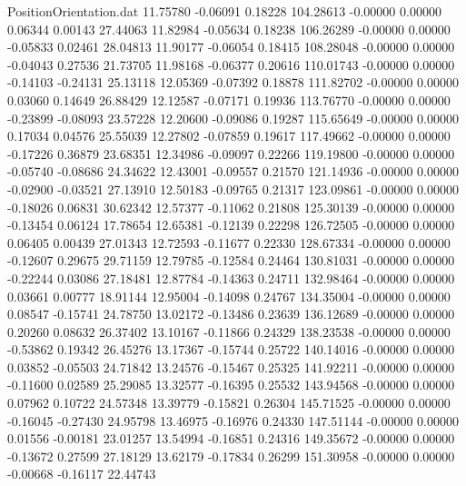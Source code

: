 \begin{filecontents}{PositionOrientation.dat}
  11.75780   -0.06091    0.18228   104.28613   -0.00000    0.00000    0.06344    0.00143   27.44063
  11.82984   -0.05634    0.18238   106.26289   -0.00000    0.00000   -0.05833    0.02461   28.04813
  11.90177   -0.06054    0.18415   108.28048   -0.00000    0.00000   -0.04043    0.27536   21.73705
  11.98168   -0.06377    0.20616   110.01743   -0.00000    0.00000   -0.14103   -0.24131   25.13118
  12.05369   -0.07392    0.18878   111.82702   -0.00000    0.00000    0.03060    0.14649   26.88429
  12.12587   -0.07171    0.19936   113.76770   -0.00000    0.00000   -0.23899   -0.08093   23.57228
  12.20600   -0.09086    0.19287   115.65649   -0.00000    0.00000    0.17034    0.04576   25.55039
  12.27802   -0.07859    0.19617   117.49662   -0.00000    0.00000   -0.17226    0.36879   23.68351
  12.34986   -0.09097    0.22266   119.19800   -0.00000    0.00000   -0.05740   -0.08686   24.34622
  12.43001   -0.09557    0.21570   121.14936   -0.00000    0.00000   -0.02900   -0.03521   27.13910
  12.50183   -0.09765    0.21317   123.09861   -0.00000    0.00000   -0.18026    0.06831   30.62342
  12.57377   -0.11062    0.21808   125.30139   -0.00000    0.00000   -0.13454    0.06124   17.78654
  12.65381   -0.12139    0.22298   126.72505   -0.00000    0.00000    0.06405    0.00439   27.01343
  12.72593   -0.11677    0.22330   128.67334   -0.00000    0.00000   -0.12607    0.29675   29.71159
  12.79785   -0.12584    0.24464   130.81031   -0.00000    0.00000   -0.22244    0.03086   27.18481
  12.87784   -0.14363    0.24711   132.98464   -0.00000    0.00000    0.03661    0.00777   18.91144
  12.95004   -0.14098    0.24767   134.35004   -0.00000    0.00000    0.08547   -0.15741   24.78750
  13.02172   -0.13486    0.23639   136.12689   -0.00000    0.00000    0.20260    0.08632   26.37402
  13.10167   -0.11866    0.24329   138.23538   -0.00000    0.00000   -0.53862    0.19342   26.45276
  13.17367   -0.15744    0.25722   140.14016   -0.00000    0.00000    0.03852   -0.05503   24.71842
  13.24576   -0.15467    0.25325   141.92211   -0.00000    0.00000   -0.11600    0.02589   25.29085
  13.32577   -0.16395    0.25532   143.94568   -0.00000    0.00000    0.07962    0.10722   24.57348
  13.39779   -0.15821    0.26304   145.71525   -0.00000    0.00000   -0.16045   -0.27430   24.95798
  13.46975   -0.16976    0.24330   147.51144   -0.00000    0.00000    0.01556   -0.00181   23.01257
  13.54994   -0.16851    0.24316   149.35672   -0.00000    0.00000   -0.13672    0.27599   27.18129
  13.62179   -0.17834    0.26299   151.30958   -0.00000    0.00000   -0.00668   -0.16117   22.44743

\end{filecontents}
